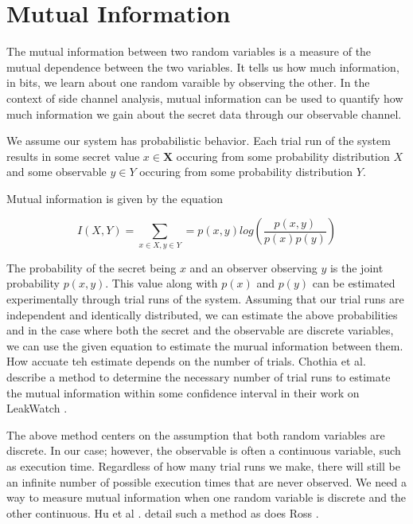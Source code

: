 \documentclass{article}
\begin{document}
\section{Mutual Information} 

The mutual information between two random variables is a measure of the mutual
dependence between the two variables. It tells us how much information, in
bits, we learn about one random varaible by observing the other. In the context
of side channel analysis, mutual information can be used to quantify how much
information we gain about the secret data through our observable channel. 

We assume our system has probabilistic behavior. Each trial run of the system
results in some secret value $x \in \textbf{X}$ occuring from some probability
distribution $X$ and some observable $y \in \textit{Y}$ occuring from some
probability distribution $Y$. 

Mutual information is given by the equation

\begin{equation}
I(X,Y)  = \sum_{x \in X, y \in Y} = p(x,y) log \left(\frac{p(x,y)}{p(x)p(y)}\right)
\end{equation}

The probability of the secret being $x$ and an observer observing $y$ is the
joint probability $p(x,y)$. This value along with $p(x)$ and $p(y)$ can be
estimated experimentally through trial runs of the system. Assuming that our
trial runs are independent and identically distributed, we can estimate the
above probabilities and in the case where both the secret and the observable
are discrete variables, we can use the given equation to estimate the murual
information between them. How accuate teh estimate depends on the number of
trials. Chothia et al. describe a method to determine the necessary number of
trial runs to estimate the mutual information within some confidence interval
in their work on LeakWatch \cite{leakwatch}.

The above method centers on the assumption that both random variables are
discrete. In our case; however, the observable is often a continuous variable,
such as execution time. Regardless of how many trial runs we make, there will
still be an infinite number of possible execution times that are never
observed. We need a way to measure mutual information when one random variable
is discrete and the other continuous. Hu et al \cite{continuous}. detail such a
method as does Ross \cite{continuous2}.
\end{document}
